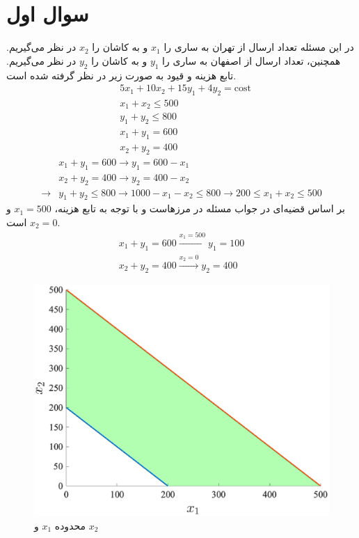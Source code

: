\section{سوال اول}
در این مسئله تعداد ارسال از تهران به ساری را
$x_1$
و به کاشان را
$x_2$
در نظر می‌گیریم. همچنین،  تعداد ارسال از اصفهان به ساری را
$y_1$
و به کاشان را
$y_2$
در نظر می‌گیریم. تابع هزینه و قیود به صورت زیر در نظر گرفته شده است.
\begin{align*}
	& 5x_1 + 10x_2 + 15y_1 + 4y_2 = \text{cost}  \\
	&x_1 + x_2 \leq 500\\
	&y_1 + y_2 \leq 800\\
	&x_1 + y_1 = 600 \\
	&x_2 + y_2 = 400
\end{align*}
\begin{align*}
	&x_1 + y_1 = 600 \rightarrow y_1 = 600 - x_1\\
	&x_2 + y_2 = 400 \rightarrow y_2 = 400 - x_2\\	
	\rightarrow &y_1 + y_2 \leq 800  \rightarrow 1000 - x_1 -x_2 \leq 800 \rightarrow 200 \leq x_1 + x_2 \leq 500
\end{align*} 
بر اساس قضیه‌ای در 
جواب مسئله در مرزهاست و با توجه به تابع هزینه،
$x_1 = 500$
و
$x_2 = 0$
است.
\begin{align*}
	x_1 + y_1 = 600 \xrightarrow{x_1 = 500} y_1 = 100 \\
	x_2 + y_2 = 400 \xrightarrow{x_2 = 0} y_2 = 400
\end{align*}

\begin{figure}[H]
	\caption{محدوده $x_1$ و $x_2$} 
	\centering 
	\includegraphics[width=12cm]{../Figure/Q1/valid_x1_x2} 
\end{figure}

